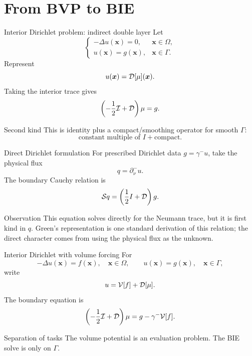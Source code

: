 \documentclass[aspectratio=169,11pt]{beamer}
\newcommand{\x}{\bm{x}}
\begin{document}
\section{From BVP to BIE}

\begin{frame}{Interior Dirichlet problem: indirect double layer}
\small
Let
\[
\begin{cases}
  -\Delta u(\x)=0, & \x\in\Omega,\\
  u(\x)=g(\x), & \x\in\Gamma.
\end{cases}
\]
Represent
\[
  u(\x)=\Dop[\mu](\x).
\]
Taking the interior trace gives
\[
  \left(-\frac12\mathcal{I}+\mathcal{D}\right)\mu=g.
\]

\begin{block}{Second kind}
This is identity plus a compact/smoothing operator for smooth $\Gamma$:
\[
  \text{constant multiple of }I+\text{compact}.
\]
\end{block}
\end{frame}

\begin{frame}{Direct Dirichlet formulation}
\small
For prescribed Dirichlet data $g=\gamma^-u$, take the physical flux
\[
q=\partial_\nu^-u.
\]
The boundary Cauchy relation is
\[
\mathcal{S} q=\left(\frac12 I+\mathcal{D}\right)g.
\]

\begin{block}{Observation}
This equation solves directly for the Neumann trace, but it is first kind in
$q$.  Green's representation is one standard derivation of this relation;
the direct character comes from using the physical flux as the unknown.
\end{block}
\end{frame}

\begin{frame}{Interior Dirichlet with volume forcing}
\small
For
\[
  -\Delta u(\x)=f(\x),\quad \x\in\Omega,
  \qquad
  u(\x)=g(\x),\quad \x\in\Gamma,
\]
write
\[
  u=\mathcal{V}[f]+\mathcal{D}[\mu].
\]
The boundary equation is
\[
  \left(-\frac12\mathcal{I}+\mathcal{D}\right)\mu
  =
  g-\gamma^-\mathcal{V}[f].
\]

\begin{block}{Separation of tasks}
The volume potential is an evaluation problem. The BIE solve is only on
$\Gamma$.
\end{block}
\end{frame}
\end{document}
